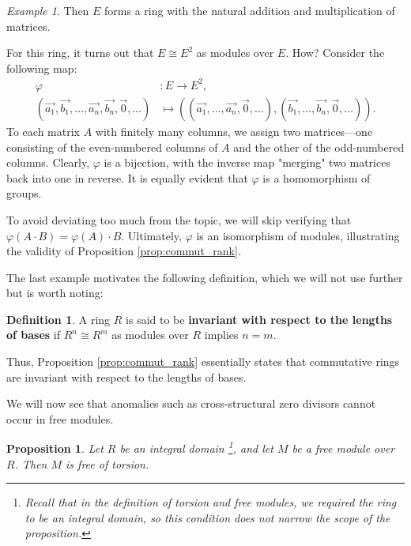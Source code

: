 \documentclass{article}
\newif\ifusemulticols
\newcommand\newterm[1]{\textbf{#1}}
\theoremstyle{definition}
\newtheorem{deff}{Definition}
\theoremstyle{remark}
\newtheorem{example}{Example}[section]
\theoremstyle{plain}
\theoremstyle{plain}
\newtheorem{prop}[theorem]{Proposition}
\newenvironment{mymulticols}
    { \ifusemulticols \begin{multicols}{2} \fi }
    { \ifusemulticols \end{multicols} \fi }
\begin{document}
\begin{mymulticols}
\begin{example}
    Then $E$ forms a ring with the natural addition and multiplication of matrices.

    For this ring, it turns out that $E \cong E^2$ as modules over $E$. 
    How? Consider the following map:
    \begin{align*}
        \varphi &: E \to E^2,\\
        \left( \vec{a_1}, \vec{b_1}, \dots, \vec{a_n}, \vec{b_n}, \vec{0}, \dots \right) &\mapsto
            \left(
                \left( \vec{a_1}, \dots, \vec{a_n}, \vec{0}, \dots \right),
                \left( \vec{b_1}, \dots, \vec{b_n}, \vec{0}, \dots \right)
            \right).
    \end{align*}
    To each matrix $A$ with finitely many columns, we assign two matrices—one consisting of the
    even-numbered columns of $A$ and the other of the odd-numbered columns. Clearly, $\varphi$ is a
    bijection, with the inverse map "merging" two matrices back into one in reverse. It is equally
    evident that $\varphi$ is a homomorphism of groups.

    To avoid deviating too much from the topic, we will skip verifying that $\varphi(A \cdot B) =
    \varphi(A) \cdot B$. Ultimately, $\varphi$ is an isomorphism of modules, illustrating the
    validity of Proposition \ref{prop:commut_rank}.
\end{example}

The last example motivates the following definition, which we will not use further but is worth
noting:

\begin{deff}
    A ring $R$ is said to be \newterm{invariant with respect to the lengths of bases} if $R^n \cong
    R^m$ as modules over $R$ implies $n = m$.
\end{deff}

Thus, Proposition \ref{prop:commut_rank} essentially states that commutative rings are invariant
with respect to the lengths of bases.

We will now see that anomalies such as cross-structural zero divisors cannot occur in free modules.

\begin{prop}
    Let $R$ be an integral domain%
    \footnote{Recall that in the definition of torsion and free modules, we required the ring to be
    an integral domain, so this condition does not narrow the scope of the proposition.},
    and let $M$ be a free module over $R$. Then $M$ is free of torsion.
\end{prop}


\end{mymulticols}
\end{document}
